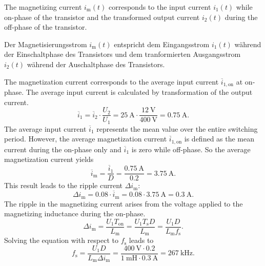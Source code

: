 \begin{hintblock}
	The magnetizing current $i_\mathrm{m}(t)$ corresponds to the input current $i_\mathrm{1}(t)$ while on-phase of the transistor
	and the transformed output current $i_\mathrm{2}(t)$ during the off-phase of the transistor.
\end{hintblock}


\begin{germanhintblock}
	Der Magnetisierungsstrom $i_\mathrm{m}(t)$ entspricht dem Eingangsstrom $i_\mathrm{1}(t)$ während der Einschaltphase des Transistors
	und dem tranformierten Ausgangsstrom $i_\mathrm{2}(t)$ während der Auschaltphase des Transistors.
\end{germanhintblock}

\begin{solutionblock}
	The magnetization current corresponds to the average input current $\overline{i}_\mathrm{1,on}$ at on-phase.
	The average input current is calculated by transformation of the output current.
	\begin{equation*}
		\overline{i}_\mathrm{1} = \overline{i}_\mathrm{2} \cdot \frac{U_\mathrm{2}}{U_\mathrm{1}} =   \SI{25}{\ampere}  \cdot \frac{\SI{12}{\volt}}{\SI{400}{\volt}} = \SI{0.75}{\ampere}.
	\end{equation*}
	The average input current $\overline{i}_\mathrm{1}$ represents the mean value over the entire switching period. However, the average magnetization current
	$\overline{i}_\mathrm{1,on}$ is defined as the mean current during the on-phase only and $\overline{i}_\mathrm{1}$ is zero while off-phase.
	So the average magnetization current yields
	\begin{equation*}
		\overline{i}_\mathrm{m} = \frac{\overline{i}_\mathrm{1}}{D} =   \frac{\SI{0.75}{\ampere}}{0.2} = \SI{3.75}{\ampere}.
	\end{equation*}
	This result leads to the ripple current $\Delta i_\mathrm{m}$:
	\begin{equation*}
		\Delta i_\mathrm{m}= 0.08 \cdot \overline{i}_\mathrm{m} = 0.08 \cdot \SI{3.75}{\ampere} = \SI{0.3}{\ampere}.
	\end{equation*}
	The ripple in the magnetizing current arises from the voltage applied to the magnetizing inductance during the on-phase.
	\begin{equation*}
		\Delta i_\mathrm{m} =\frac{U_\mathrm{1}T_\mathrm{on}}{L_\mathrm{m}}
		= \frac{U_\mathrm{1}T_\mathrm{s} D }{L_\mathrm{m}} = \frac{U_\mathrm{1} D }{L_\mathrm{m} f_\mathrm{s}} .
	\end{equation*}
	Solving the equation with respect to $f_\mathrm{s}$ leads to
	\begin{equation*}
		f_\mathrm{s} = \frac{U_\mathrm{1} D }{L_\mathrm{m} \Delta i_\mathrm{m}} = \frac{\SI{400}{\volt} \cdot 0.2}{\SI{1}{\milli\henry} \cdot \SI{0.3}{\ampere}} = \SI{267}{\kilo\hertz}.
	\end{equation*}
\end{solutionblock}

